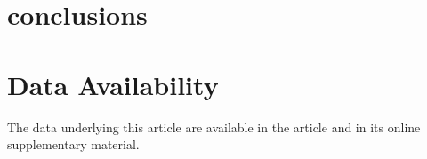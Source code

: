 \documentclass[twocolumn]{aastex631}
\begin{document}
\section{conclusions}

\section*{Data Availability}
The data underlying this article are available in the article and in its online supplementary material.












\appendix
\end{document}
